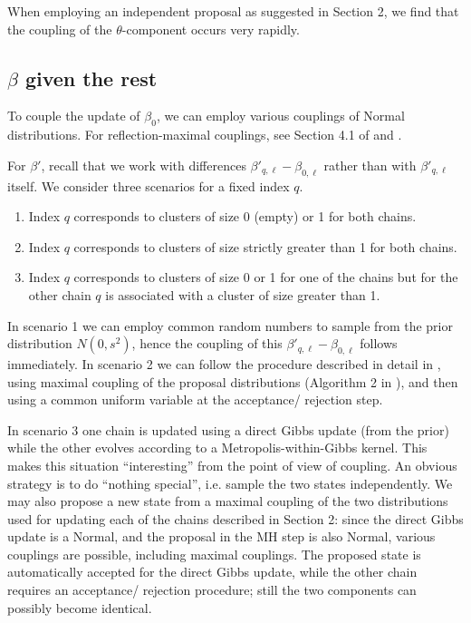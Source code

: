 \documentclass{article}
\begin{document}
When employing an independent proposal as suggested in Section 2, we find that 
the coupling of the $\theta$-component occurs very rapidly.


\subsection{\texorpdfstring{$\beta$}{beta} given the rest}
To couple the update of $\beta_0$, we can employ
various couplings of Normal distributions. For reflection-maximal couplings, see Section 4.1 of \cite{jacob2017unbiased} and \cite{bou2018coupling}.

For $\beta'$, recall that we work with differences $\beta'_{q,\ell} - \beta_{0,\ell}$ rather than with $\beta'_{q,\ell}$ itself. We consider three scenarios for a fixed index $q$.
\begin{enumerate}
    \item Index $q$ corresponds to clusters of size 0 (empty) or 1 for both chains. 
    \item Index $q$ corresponds to clusters of size strictly greater than 1 for both chains.
    \item Index $q$ corresponds to clusters of size 0 or 1 for one of the chains but for the other chain $q$ is associated with a cluster of size greater than 1.
\end{enumerate}
In scenario 1 we can employ common random numbers to sample
from the prior distribution $N(0, s^2)$, hence the coupling of this $\beta'_{q,\ell} - \beta_{0,\ell}$ follows immediately. 
In scenario 2 we can follow the procedure described in detail in \cite{jacob2017unbiased}, using maximal coupling of the proposal distributions (Algorithm 2 in \cite{jacob2017unbiased}), and then using a common uniform variable at the acceptance/ rejection step.

In scenario 3 one chain is updated using a direct Gibbs update (from the prior) while the other evolves according to a Metropolis-within-Gibbs kernel. This makes this situation ``interesting'' from the point of view of coupling. 
An obvious strategy is to do ``nothing special'', i.e. sample the two 
states independently.
We may also propose a new state from a maximal coupling of the two distributions used for updating each of the chains described in Section 2: since the direct Gibbs update is a Normal, and the proposal in the MH step is also Normal, various couplings are possible, including maximal couplings.
The proposed state is automatically accepted for the direct Gibbs update, while the other chain requires an acceptance/ rejection procedure; still the two components can possibly become identical.
\end{document}
